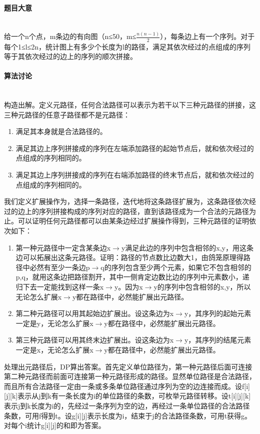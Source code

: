 \documentclass[UTF8]{ctexart}
\newcommand{\myparagraph}[1]{\paragraph{#1}\mbox{}\\}
\theoremstyle{nonumberplain}
\begin{document}
		\myparagraph{题目大意}
		
			给一个n个点，m条边的有向图（n≤50，m≤$\frac{n(n-1)}{2}$），每条边上有一个序列。对于每个1≤l≤2n，统计图上有多少个长度为l的路径，满足其依次经过的点组成的序列等于其依次经过的边上的序列的顺次拼接。
			
		\myparagraph{算法讨论}
		
			构造出解。定义元路径，任何合法路径可以表示为若干以下三种元路径的拼接，这三种元路径的任意子路径都不是元路径：
			
			\begin{enumerate}
				\item 满足其本身就是合法路径的。
				\item 满足其边上序列拼接成的序列在左端添加路径的起始节点后，就和依次经过的点组成的序列相同的。
				\item 满足其边上序列拼接成的序列在右端添加路径的终末节点后，就和依次经过的点组成的序列相同的。
			\end{enumerate}
			
			我们定义扩展操作为，选择一条路径，迭代地将这条路径扩展为，这条路径依次经过的边上的序列拼接构成的序列对应的路径，直到该路径成为一个合法的元路径为止。可以证明任何元路径都可以由某条边经过扩展操作得到，三种元路径的证明依次如下：
			
			\begin{enumerate}
				\item 第一种元路径中一定含某条边x$\rightarrow$y满足此边的序列中包含相邻的x,y，用这条边可以拓展出这条元路径。证明：路径的节点数比边数大1，由鸽笼原理得路径中必然有至少一条边p$\rightarrow$q的序列包含至少两个元素，如果它不包含相邻的p,q，就用这条边把路径割开，其中一侧肯定边数比边的序列中元素数小，递归下去一定能找到这样一条x$\rightarrow$y。因为x$\rightarrow$y的序列中包含相邻的x,y，所以无论怎么扩展x$\rightarrow$y都在路径中，必然能扩展出元路径。
				\item 第二种元路径可以用其起始边扩展出。设这条边为x$\rightarrow$y，其序列的起始元素一定是y，无论怎么扩展x$\rightarrow$y都在路径中，必然能扩展出元路径。
				\item 第三种元路径可以用其终末边扩展出。设这条边为x$\rightarrow$y，其序列的结尾元素一定是x，无论怎么扩展x$\rightarrow$y都在路径中，必然能扩展出元路径。
			\end{enumerate}
			
			处理出元路径后，DP算出答案。首先定义单位路径为，第一种元路径后面可连接第二种元路径而前面可连接第一种元路径形成的路径。显然单位路径是合法路径，而且所有合法路径一定由一条或多条单位路径通过序列为空的边连接而成。设f[i][j][k]表示从j到k有一条长度为i的单位路径的条数，可枚举元路径转移。设t[i][j][k]表示j到k长度为i的，先经过一条序列为空的边，再经过一条单位路径的合法路径条数，可用f得到t。设g[i][j]表示长度为i，结束于j的合法路径条数，可用t获得g。对每个i统计g[i][j]的和即为答案。
		
\end{document}
